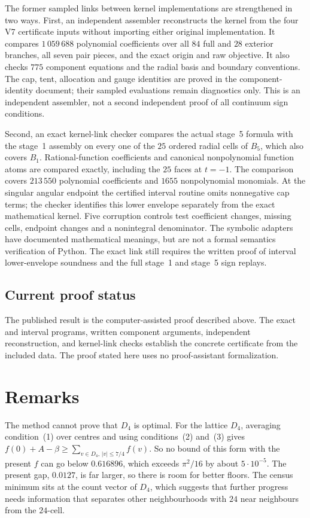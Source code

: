 \documentclass[11pt]{amsart}
\numberwithin{equation}{section}
\theoremstyle{remark}
\begin{document}
The former sampled links between kernel implementations are strengthened in two ways. First, an independent assembler reconstructs the kernel from the four V7 certificate inputs without importing either original implementation. It compares $1\,059\,688$ polynomial coefficients over all $84$ full and $28$ exterior branches, all seven pair pieces, and the exact origin and raw objective. It also checks $775$ component equations and the radial basis and boundary conventions. The cap, tent, allocation and gauge identities are proved in the component-identity document; their sampled evaluations remain diagnostics only. This is an independent assembler, not a second independent proof of all continuum sign conditions.

Second, an exact kernel-link checker compares the actual stage~5 formula with the stage~1 assembly on every one of the $25$ ordered radial cells of $B_5$, which also covers $B_1$. Rational-function coefficients and canonical nonpolynomial function atoms are compared exactly, including the $25$ faces at $t=-1$. The comparison covers $213\,550$ polynomial coefficients and $1655$ nonpolynomial monomials. At the singular angular endpoint the certified interval routine omits nonnegative cap terms; the checker identifies this lower envelope separately from the exact mathematical kernel. Five corruption controls test coefficient changes, missing cells, endpoint changes and a nonintegral denominator. The symbolic adapters have documented mathematical meanings, but are not a formal semantics verification of Python. The exact link still requires the written proof of interval lower-envelope soundness and the full stage~1 and stage~5 sign replays.

\subsection*{Current proof status}
The published result is the computer-assisted proof described above. The exact and interval programs, written component arguments, independent reconstruction, and kernel-link checks establish the concrete certificate from the included data. The proof stated here uses no proof-assistant formalization.

\section{Remarks}

The method cannot prove that $D_4$ is optimal. For the lattice $D_4$, averaging condition~(1) over centres and using conditions~(2) and~(3) gives $f(0)+A-\beta\ge\sum_{v\in D_4,\,|v|\le7/4}f(v)$. So no bound of this form with the present $f$ can go below $0.616896$, which exceeds $\pi^2/16$ by about $5\cdot10^{-5}$. The present gap, $0.0127$, is far larger, so there is room for better floors. The census minimum sits at the count vector of $D_4$, which suggests that further progress needs information that separates other neighbourhoods with $24$ near neighbours from the $24$-cell.
\end{document}
